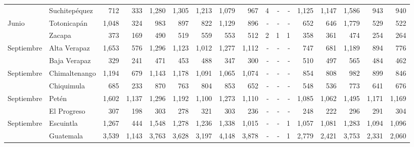 \begin{landscape}
\begin{center}
\begin{longtable}{llrrrrrrrrrrrrrrr}
			\rowcolor{color1!5!white}\multicolumn{1}{l}{	\footnotesize	 Junio 	}&	 Suchitepéquez 	&	 712 	&	 333 	&	 1,280 	&	 1,305 	&	 1,213 	&	 1,079 	&	 967 	&	 4 	&	 -   	&	 -   	&	 1,125 	&	 1,147 	&	 1,586 	&	 943 	&	 940 	\\
			\multicolumn{1}{l}{	\footnotesize	 Junio 	}&	 Totonicapán 	&	 1,048 	&	 324 	&	 983 	&	 897 	&	 822 	&	 1,129 	&	 896 	&	 -   	&	 -   	&	 -   	&	 652 	&	 646 	&	 1,779 	&	 529 	&	 522 	\\
			\rowcolor{color1!5!white}\multicolumn{1}{l}{	\footnotesize	 Junio 	}&	 Zacapa 	&	 373 	&	 169 	&	 490 	&	 519 	&	 559 	&	 553 	&	 512 	&	 2 	&	 1 	&	 1 	&	 358 	&	 361 	&	 474 	&	 254 	&	 264 	\\
			\multicolumn{1}{l}{	\footnotesize	 Septiembre 	}&	 Alta Verapaz 	&	 1,653 	&	 576 	&	 1,296 	&	 1,123 	&	 1,012 	&	 1,277 	&	 1,112 	&	 -   	&	 -   	&	 -   	&	 747 	&	 681 	&	 1,189 	&	 894 	&	 776 	\\
			\rowcolor{color1!5!white}\multicolumn{1}{l}{	\footnotesize	 Septiembre 	}&	 Baja Verapaz 	&	 329 	&	 241 	&	 471 	&	 453 	&	 488 	&	 347 	&	 300 	&	 -   	&	 -   	&	 -   	&	 510 	&	 497 	&	 565 	&	 484 	&	 462 	\\
			\multicolumn{1}{l}{	\footnotesize	 Septiembre 	}&	 Chimaltenango 	&	 1,194 	&	 679 	&	 1,143 	&	 1,178 	&	 1,091 	&	 1,065 	&	 1,074 	&	 -   	&	 -   	&	 -   	&	 854 	&	 808 	&	 982 	&	 899 	&	 846 	\\
			\rowcolor{color1!5!white}\multicolumn{1}{l}{	\footnotesize	 Septiembre 	}&	 Chiquimula 	&	 685 	&	 233 	&	 870 	&	 763 	&	 804 	&	 853 	&	 652 	&	 -   	&	 -   	&	 -   	&	 548 	&	 536 	&	 773 	&	 641 	&	 676 	\\
			\multicolumn{1}{l}{	\footnotesize	 Septiembre 	}&	 Petén 	&	 1,602 	&	 1,137 	&	 1,296 	&	 1,192 	&	 1,100 	&	 1,273 	&	 1,110 	&	 -   	&	 -   	&	 -   	&	 1,085 	&	 1,062 	&	 1,495 	&	 1,171 	&	 1,169 	\\
			\rowcolor{color1!5!white}\multicolumn{1}{l}{	\footnotesize	 Septiembre 	}&	 El Progreso 	&	 307 	&	 198 	&	 303 	&	 278 	&	 321 	&	 303 	&	 236 	&	 -   	&	 -   	&	 -   	&	 248 	&	 222 	&	 296 	&	 291 	&	 304 	\\
			\multicolumn{1}{l}{	\footnotesize	 Septiembre 	}&	 Escuintla 	&	 1,267 	&	 444 	&	 1,548 	&	 1,278 	&	 1,236 	&	 1,338 	&	 1,015 	&	 -   	&	 -   	&	 1 	&	 1,057 	&	 1,081 	&	 1,283 	&	 1,094 	&	 1,096 	\\
			\rowcolor{color1!5!white}\multicolumn{1}{l}{	\footnotesize	 Septiembre 	}&	 Guatemala 	&	 3,539 	&	 1,143 	&	 3,763 	&	 3,628 	&	 3,197 	&	 4,148 	&	 3,878 	&	 -   	&	 -   	&	 1 	&	 2,779 	&	 2,421 	&	 3,753 	&	 2,331 	&	 2,060 	\\

\end{longtable}
\end{center}
\end{landscape}
